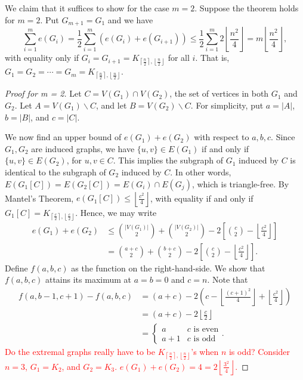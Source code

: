 \documentclass[a4paper]{article}
\begin{document}
We claim that it suffices to show for the case $m = 2$. Suppose the theorem holds for $m = 2$. Put
$G_{m + 1} = G_1$ and we have
\[
  \sum_{i = 1}^m e(G_i) = \frac{1}{2}\sum_{i = 1}^m (e(G_i) + e(G_{i + 1})) \leq \frac{1}{2}\sum_{i = 1}^m 2\left\lfloor\frac{n^2}{4}\right\rfloor = m\left\lfloor\frac{n^2}{4}\right\rfloor,
\]
with equality only if $G_i = G_{i + 1} = K_{\left\lceil\frac{n}{2}\right\rceil,
  \left\lfloor\frac{n}{2}\right\rfloor}$ for all $i$. That is, $G_1 = G_2 = \cdots = G_m =
  K_{\left\lceil\frac{n}{2}\right\rceil, \left\lfloor\frac{n}{2}\right\rfloor}$.

\begin{proof}[Proof for m = 2]
  Let $C = V(G_1) \cap V(G_2)$, the set of vertices in both $G_1$ and $G_2$. Let $A = V(G_1)
  \backslash C$, and let $B = V(G_2) \backslash C$. For simplicity, put $a = |A|$, $b = |B|$, and $c
  = |C|$. 

  We now find an upper bound of $e(G_1) + e(G_2)$ with respect to $a, b, c$. Since $G_1, G_2$ are
  induced graphs, we have $\{u, v\} \in E(G_1)$ if and only if $\{u, v\} \in E(G_2)$, for $u, v \in
  C$. This implies the subgraph of $G_1$ induced by $C$ is identical to the subgraph of $G_2$
  induced by $C$. In other words, $E(G_1[C]) = E(G_2[C]) = E(G_i) \cap E(G_j)$, which is
  triangle-free. By Mantel's Theorem, $e(G_1[C]) \leq \left\lfloor\frac{c^2}{4}\right\rfloor$, with
  equality if and only if $G_1[C] = K_{\left\lceil\frac{c}{2}\right\rceil,
  \left\lfloor\frac{c}{2}\right\rfloor}$. Hence, we may write
  \begin{align*}
    e(G_1) + e(G_2) 
    &\leq \binom{|V(G_1)|}{2} + \binom{|V(G_2)|}{2} - 2\left[\binom{c}{2} - \left\lfloor\frac{c^2}{4}\right\rfloor\right] \\
    &= \binom{a + c}{2} + \binom{b + c}{2} - 2\left[\binom{c}{2} - \left\lfloor\frac{c^2}{4}\right\rfloor\right].
  \end{align*}
  Define $f(a, b, c)$ as the function on the right-hand-side. We show that $f(a, b, c)$ attains its
  maximum at $a = b = 0$ and $c = n$. Note that
  \begin{align*}
    f(a, b - 1, c + 1) - f(a, b, c)
    &= (a + c) - 2\left(c - \left\lfloor\frac{(c + 1)^2}{4}\right\rfloor + \left\lfloor\frac{c^2}{4}\right\rfloor\right) \\
    &= (a + c) - 2\left\lfloor\frac{c}{2}\right\rfloor \\
    &= \begin{cases}
      a & c \text{ is even} \\
      a + 1 & c \text{ is odd}
    \end{cases}.
  \end{align*}
  \textcolor{red}{Do the extremal graphs really have to be $K_{\left\lceil\frac{n}{2}\right\rceil,
  \left\lfloor\frac{n}{2}\right\rfloor}$'s when $n$ is odd? Consider $n = 3$, $G_1 = K_2$, and $G_2
  = K_3$. $e(G_1) + e(G_2) = 4 = 2\left\lfloor\frac{3^2}{4}\right\rfloor$.}
\end{proof}
\end{document}
